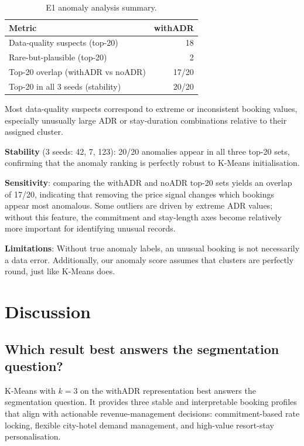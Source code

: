 \documentclass[11pt,a4paper]{article}
\begin{document}
\begin{table}[H]
\centering
\caption{E1 anomaly analysis summary.}
\begin{tabular}{lr} %
\toprule
\textbf{Metric} & \textbf{withADR} \\
\midrule
Data-quality suspects (top-20) & 18 \\
Rare-but-plausible (top-20) & 2 \\
Top-20 overlap (withADR vs noADR) & 17/20 \\ %
Top-20 in all 3 seeds (stability) & 20/20 \\ %
\bottomrule
\end{tabular}
\end{table}

Most data-quality suspects correspond to extreme or inconsistent booking values, especially unusually large ADR or stay-duration combinations relative to their assigned cluster.

\textbf{Stability} (3 seeds: 42, 7, 123): 20/20 anomalies appear in all three top-20 sets, confirming that the anomaly ranking is perfectly robust to K-Means initialisation.

\textbf{Sensitivity}: comparing the withADR and noADR top-20 sets yields an overlap of 17/20, indicating that removing the price signal changes which bookings appear most anomalous. Some outliers are driven by extreme ADR values; without this feature, the commitment and stay-length axes become relatively more important for identifying unusual records.

\textbf{Limitations}: Without true anomaly labels, an unusual booking is not necessarily a data error. Additionally, our anomaly score assumes that clusters are perfectly round, just like K-Means does.
\section{Discussion}

\subsection{Which result best answers the segmentation question?}
K-Means with $k=3$ on the withADR representation best answers the segmentation question. It provides three stable and interpretable booking profiles that align with actionable revenue-management decisions: commitment-based rate locking, flexible city-hotel demand management, and high-value resort-stay personalisation.
\end{document}
